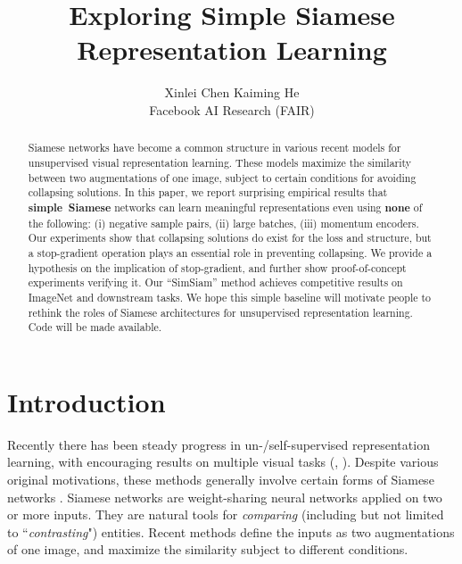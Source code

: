 \documentclass[final]{cvpr}
\begin{document}
\title{\vspace{-1.em} Exploring Simple Siamese Representation Learning \vspace{-.5em}}

\author{
Xinlei Chen \qquad Kaiming He \vspace{.5em} \\
Facebook AI Research (FAIR)
\vspace{1.em}  %
}

\maketitle

\begin{abstract}
\vspace{-.5em}
Siamese networks have become a common structure in various recent models for unsupervised visual representation learning.
These models maximize the similarity between two augmentations of one image, subject to certain conditions for avoiding collapsing solutions. In this paper, we report surprising empirical results that \mbox{\textbf{simple Siamese}} networks can learn meaningful representations even using \textbf{none} of the following: (i) negative sample pairs, (ii) large batches, (iii) momentum encoders. Our experiments show that collapsing solutions do exist for the loss and structure, but a stop-gradient operation plays an essential role in preventing collapsing.
We provide a hypothesis on the implication of stop-gradient, and further show proof-of-concept experiments verifying it.
Our ``SimSiam'' method achieves competitive results on ImageNet and downstream tasks. 
We hope this simple baseline will motivate people to rethink the roles of Siamese architectures for unsupervised representation learning. Code will be made available.
\vspace{-.5em}
\end{abstract}

\section{Introduction\label{sec:intro}}

Recently there has been steady progress in un-/self-supervised representation learning, with encouraging results on multiple visual tasks (\eg, \cite{Bachman2019,He2019a,Chen2020,Grill2020,Caron2020}). Despite various original motivations, these methods generally involve certain forms of Siamese networks \cite{Bromley1994}. Siamese networks are weight-sharing neural networks applied on two or more inputs. They are natural tools for \emph{comparing} (including but not limited to ``\emph{contrasting}") entities. Recent methods define the inputs as two augmentations of one image, and maximize the similarity subject to different conditions.
\end{document}
